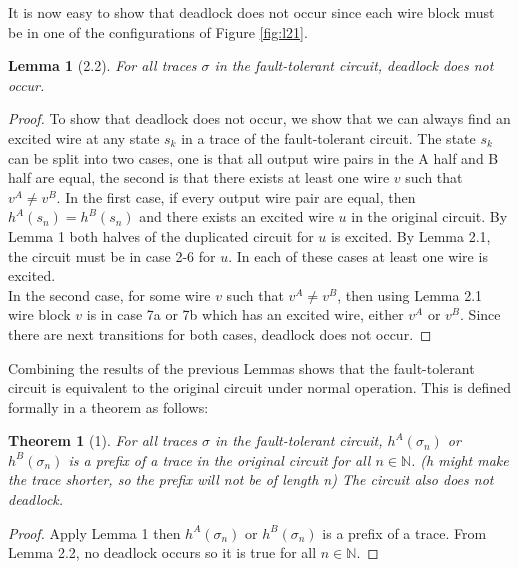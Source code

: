 \documentclass[12pt]{report}
\newtheorem*{theorem}{Theorem}
\newtheorem*{lemma}{Lemma}
\begin{document}
It is now easy to show that deadlock does not occur since each wire block must be in one of the configurations of Figure \ref{fig:l21}.
\begin{lemma}[2.2]
For all traces $\sigma$ in the fault-tolerant circuit, deadlock does not occur.
\end{lemma}
\begin{proof}
To show that deadlock does not occur, we show that we can always find an excited wire at any state $s_k$ in a trace of the fault-tolerant circuit.  The state $s_k$ can be split into two cases, one is that all output wire pairs in the A half and B half are equal, the second is that there exists at least one wire $v$ such that $v^A\neq v^B$.  In the first case, if every output wire pair are equal, then $h^A(s_n)=h^B(s_n)$ and there exists an excited wire $u$ in the original circuit.  By Lemma 1 both halves of the duplicated circuit for $u$ is excited.  By Lemma 2.1, the circuit must be in case 2-6 for $u$.  In each of these cases at least one wire is excited.  \\
In the second case, for some wire $v$ such that $v^A\neq v^B$, then using Lemma 2.1 wire block $v$ is in case 7a or 7b which has an excited wire, either $v^A$ or $v^B$.  Since there are next transitions for both cases, deadlock does not occur.
\end{proof}

Combining the results of the previous Lemmas shows that the fault-tolerant circuit is equivalent to the original circuit under normal operation.  This is defined formally in a theorem as follows:
\begin{theorem}[1]
For all traces $\sigma$ in the fault-tolerant circuit, $h^{A}(\sigma_n)$ or $h^{B}(\sigma_n)$ is a prefix of a trace in the original circuit for all $n \in \mathbb{N}$.  (h might make the trace shorter, so the prefix will not be of length n)  The circuit also does not deadlock. %
\end{theorem}
\begin{proof}
Apply Lemma 1 then $h^{A}(\sigma_n)$ or $h^{B}(\sigma_n)$ is a prefix of a trace.  From Lemma 2.2, no deadlock occurs so it is true for all $n\in \mathbb{N}$.
\end{proof}
\end{document}
